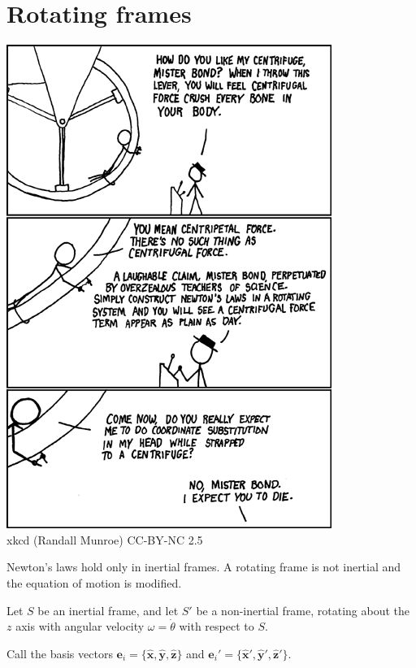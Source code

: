 \documentclass[a4paper]{article}
\begin{document}
\section{Rotating frames}
\begin{center}
  \includegraphics[scale=0.75]{images/xkcd_centrifugal_force.png}\\
  xkcd (Randall Munroe) CC-BY-NC 2.5
\end{center}
Newton's laws hold only in inertial frames. A rotating frame is not inertial and the equation of motion is modified.

Let $S$ be an inertial frame, and let $S'$ be a non-inertial frame, rotating about the $z$ axis with angular velocity $\omega = \dot{\theta}$ with respect to $S$.

Call the basis vectors $\mathbf{e}_i = \{\hat{\mathbf{x}}, \hat{\mathbf{y}}, \hat{\mathbf{z}}\}$ and $\mathbf{e}_i' = \{\hat{\mathbf{x}}', \hat{\mathbf{y}}', \hat{\mathbf{z}}'\}$.
\end{document}
